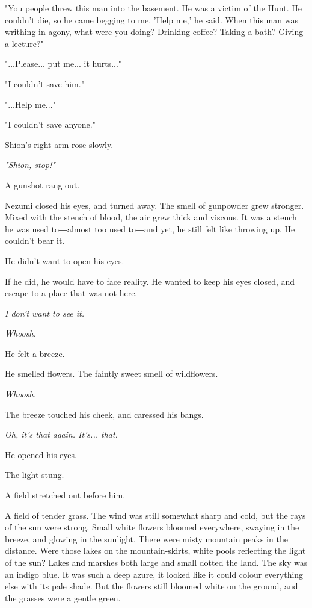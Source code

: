"You people threw this man into the basement. He was a victim of the
Hunt. He couldn't die, so he came begging to me. 'Help me,' he said.
When this man was writhing in agony, what were you doing? Drinking
coffee? Taking a bath? Giving a lecture?"

"...Please... put me... it hurts..."

"I couldn't save him."

"...Help me..."

"I couldn't save anyone."

Shion's right arm rose slowly.

\emph{"Shion, stop!"}

A gunshot rang out.

Nezumi closed his eyes, and turned away. The smell of gunpowder grew
stronger. Mixed with the stench of blood, the air grew thick and
viscous. It was a stench he was used to―almost too used to―and yet, he
still felt like throwing up. He couldn't bear it.

He didn't want to open his eyes.

If he did, he would have to face reality. He wanted to keep his eyes
closed, and escape to a place that was not here.

\emph{I don't want to see it.}

\mybreak

\emph{Whoosh.}

He felt a breeze.

He smelled flowers. The faintly sweet smell of wildflowers.

\emph{Whoosh.}

The breeze touched his cheek, and caressed his bangs.

\emph{Oh, it's that again. It's... that.}

He opened his eyes.

The light stung.

A field stretched out before him.

A field of tender grass. The wind was still somewhat sharp and cold, but
the rays of the sun were strong. Small white flowers bloomed everywhere,
swaying in the breeze, and glowing in the sunlight. There were misty
mountain peaks in the distance. Were those lakes on the mountain-skirts,
white pools reflecting the light of the sun? Lakes and marshes both
large and small dotted the land. The sky was an indigo blue. It was such
a deep azure, it looked like it could colour everything else with its
pale shade. But the flowers still bloomed white on the ground, and the
grasses were a gentle green.

